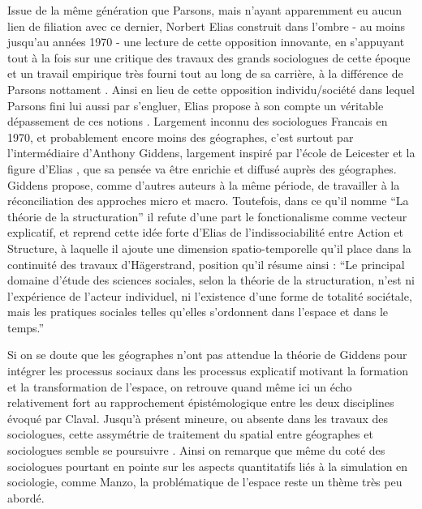 Issue de la même génération que Parsons, mais n'ayant apparemment eu aucun lien de filiation avec ce dernier, Norbert Elias construit dans l'ombre - au moins jusqu'au années 1970 - une lecture de cette opposition innovante, en s'appuyant tout à la fois sur une critique des travaux des grands sociologues de cette époque et un travail empirique très fourni tout au long de sa carrière, à la différence de Parsons nottament \autocite{Mennell1989}. Ainsi en lieu de cette opposition individu/société dans lequel Parsons fini lui aussi par s'engluer, Elias propose à son compte un véritable dépassement de ces notions \autocite[94-101]{Heinich2002}. Largement inconnu des sociologues Francais en 1970, et probablement encore moins des géographes, c'est surtout par l'intermédiaire d'Anthony Giddens, largement inspiré par l'école de Leicester et la figure d'Elias \autocite[172-178]{Dunning2013}, que sa pensée va être enrichie et diffusé auprès des géographes. Giddens propose, comme d'autres auteurs à la même période, de travailler à la réconciliation des approches micro et macro. Toutefois, dans ce qu'il nomme \enquote{La théorie de la structuration} il refute d'une part le fonctionalisme comme vecteur explicatif, et reprend cette idée forte d'Elias de l'indissociabilité entre Action et Structure, à laquelle il ajoute une dimension spatio-temporelle qu'il place dans la continuité des travaux d'Hägerstrand, position qu'il résume ainsi : \enquote{Le principal domaine d’étude des sciences sociales, selon la théorie de la structuration, n’est ni l’expérience de l’acteur individuel, ni l’existence d’une forme de totalité sociétale, mais les pratiques sociales telles qu’elles s’ordonnent dans l’espace et dans le temps.} \autocite[2]{Giddens1984, Giddens1987}


Si on se doute que les géographes n'ont pas attendue la théorie de Giddens pour intégrer les processus sociaux dans les processus explicatif motivant la formation et la transformation de l'espace, on retrouve quand même ici un écho relativement fort au rapprochement épistémologique entre les deux disciplines évoqué par Claval. Jusqu'à présent mineure, ou absente dans les travaux des sociologues, cette assymétrie de traitement du spatial entre géographes et sociologues semble se poursuivre \autocite{Rhein2003}. Ainsi on remarque que même du coté des sociologues pourtant en pointe sur les aspects quantitatifs liés à la simulation en sociologie, comme Manzo, la problématique de l'espace reste un thème très peu abordé.

